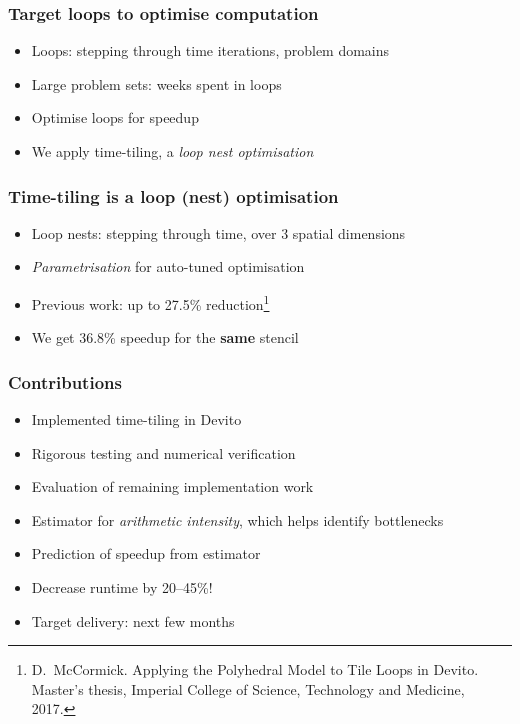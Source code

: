 \documentclass{beamer}
\begin{document}
\begin{frame}
\frametitle{Target loops to optimise computation}

\begin{itemize}
	\item Loops: stepping through time iterations, problem domains
	\item Large problem sets: weeks spent in loops
	\item Optimise loops for speedup
	\item We apply time-tiling, a \emph{loop nest optimisation}
\end{itemize}
\end{frame}



\begin{frame}
\frametitle{Time-tiling is a loop (nest) optimisation}

\begin{itemize}
	\item Loop nests: stepping through time, over 3 spatial dimensions
	\item \emph{Parametrisation} for auto-tuned optimisation
	\item Previous work: up to 27.5\% reduction\footnote{D.~McCormick. Applying the Polyhedral Model to Tile Loops in Devito. Master's thesis, Imperial College of Science, Technology and Medicine, 2017.}
	\item We get 36.8\% speedup for the \textbf{same} stencil
\end{itemize}
\end{frame}



\begin{frame}
\frametitle{Contributions}

\begin{itemize}
	\item Implemented time-tiling in Devito
	\item Rigorous testing and numerical verification
	\item Evaluation of remaining implementation work
	\item Estimator for \emph{arithmetic intensity}, which helps identify bottlenecks
	\item Prediction of speedup from estimator
	\item Decrease runtime by 20--45\%!
	\newline
	\item Target delivery: next few months
\end{itemize}
\end{frame}
\end{document}
